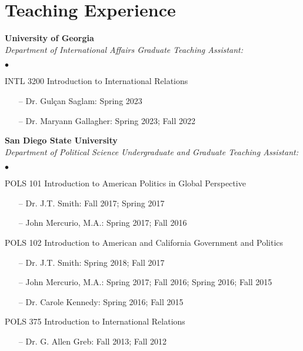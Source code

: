 \documentclass[letterpaper,12pt]{article}
\newenvironment{list2}{
  \begin{list}{$\bullet$}{%
      \setlength{\itemsep}{0in}
      \setlength{\parsep}{0in} \setlength{\parskip}{0in}
      \setlength{\topsep}{0in} \setlength{\partopsep}{0in} 
      \setlength{\leftmargin}{0.5in}}}{\end{list}}
\begin{document}
\section{Teaching Experience}
\textbf{University of Georgia}\\
\textit{Department of International Affairs Graduate Teaching Assistant:}
\begin{list2}
    \item INTL 3200 Introduction to International Relations
        \begin{itemize}
            \item[--] Dr. Gulçan Saglam: Spring 2023
            \item[--] Dr. Maryann Gallagher: Spring 2023; Fall 2022
        \end{itemize}
\end{list2}
\par
\textbf{San Diego State University}\\
\textit{Department of Political Science Undergraduate and Graduate Teaching Assistant:}
\begin{list2}
    \item POLS 101 Introduction to American Politics in Global Perspective
        \begin{itemize}
            \item[--] Dr. J.T. Smith: Fall 2017; Spring 2017
            \item[--] John Mercurio, M.A.: Spring 2017; Fall 2016
        \end{itemize}
    \item POLS 102 Introduction to American and California Government and Politics
        \begin{itemize}
            \item[--] Dr. J.T. Smith: Spring 2018; Fall 2017
            \item[--] John Mercurio, M.A.: Spring 2017; Fall 2016; Spring 2016; Fall 2015
            \item[--] Dr. Carole Kennedy: Spring 2016; Fall 2015
        \end{itemize}
    \item POLS 375 Introduction to International Relations
        \begin{itemize}
            \item[--] Dr. G. Allen Greb: Fall 2013; Fall 2012
        \end{itemize}
\end{list2}
\end{document}
